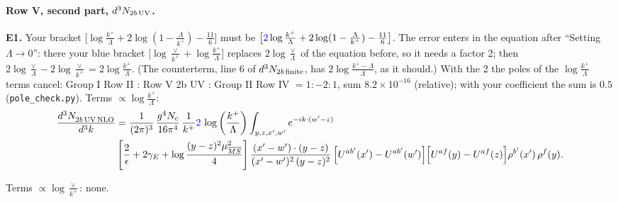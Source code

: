\documentclass[10pt]{article}
\numberwithin{equation}{section}
\newcommand{\new}[1]{{\color{blue}#1}}
\begin{document}
\paragraph{Row V, second part, $d^3N_{2b\,\rm UV}$.}
\textbf{E1.} Your bracket $\big[\log\frac{k^+}{\Lambda}+2\log(1-\frac{\Lambda}{k^+})-\frac{11}{6}\big]$ must be $\big[\new{2}\log\frac{k^+}{\Lambda}+2\log(1-\frac{\Lambda}{k^+})-\frac{11}{6}\big]$. The error enters in the equation after ``Setting $\Lambda\to0$'': there your blue bracket $\big[\log\frac{\vee}{k^+}+\log\frac{k^+}{\Lambda}\big]$ replaces $2\log\frac{\vee}{\Lambda}$ of the equation before, so it needs a factor \new{2}; then $2\log\frac{\vee}{\Lambda}-2\log\frac{\vee}{k^+}=2\log\frac{k^+}{\Lambda}$. (The counterterm, line 6 of $d^3N_{2b\,\rm finite}$, has $2\log\frac{k^+-\Lambda}{\Lambda}$, as it should.) With the 2 the poles of the $\log\frac{k^+}{\Lambda}$ terms cancel: Group I Row II : Row V 2b UV : Group II Row IV $=1:-2:1$, sum $8.2\times10^{-16}$ (relative); with your coefficient the sum is $0.5$ (\texttt{pole\_check.py}).
\noindent Terms $\propto\log\frac{k^+}{\Lambda}$:
\begin{align}
\frac{d^{3}N_{2b\,\rm UV\, NLO}^{\rm}}{d^{3}k} & =  \frac{1}{(2\pi)^{3}}\,\frac{g^{4}N_{c}}{16\pi^{4}}\,\frac{1}{k^{+}}
\new{2}\,\log{\left(\frac{k^{+}}{\Lambda}\right)}\int_{y,z,x',w'}e^{-ik\cdot(w'-z)}\notag \\ & \left[\frac{2}{\epsilon}+2\gamma_{E}+\log\frac{(y-z)^{2}\mu^{2}_{\overline{MS}}}{4}\right]
\frac{(x'-w')\cdot(y-z)}{(x'-w')^{2}\,(y-z)^{2}}\, \Big[U^{ab'}(x')-U^{ab'}(w')\Big]\Big[U^{af}(y)-U^{af}(z)\Big]\rho^{b'}(x')\,\rho^{f}(y). \label{eq:J:G1V2bUV}
\end{align}

\noindent Terms $\propto\log\frac{\vee}{k^+}$: none.
\end{document}
